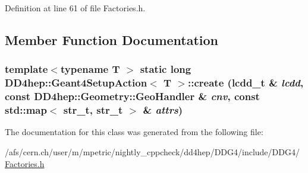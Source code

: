 Definition at line 61 of file Factories.h.

\subsection{Member Function Documentation}
\hypertarget{class_d_d4hep_1_1_geant4_setup_action_a361e27050900a95f90d6cf8a199a0820}{
\subsubsection[{create}]{\setlength{\rightskip}{0pt plus 5cm}template$<$typename T $>$ static long {\bf DD4hep::Geant4SetupAction}$<$ {\bf T} $>$::create ({\bf lcdd\_\-t} \& {\em lcdd}, \/  const {\bf DD4hep::Geometry::GeoHandler} \& {\em cnv}, \/  const std::map$<$ {\bf str\_\-t}, {\bf str\_\-t} $>$ \& {\em attrs})}}
\label{class_d_d4hep_1_1_geant4_setup_action_a361e27050900a95f90d6cf8a199a0820}


The documentation for this class was generated from the following file:\begin{DoxyCompactItemize}
\item 
/afs/cern.ch/user/m/mpetric/nightly\_\-cppcheck/dd4hep/DDG4/include/DDG4/\hyperlink{_d_d_g4_2include_2_d_d_g4_2_factories_8h}{Factories.h}\end{DoxyCompactItemize}
